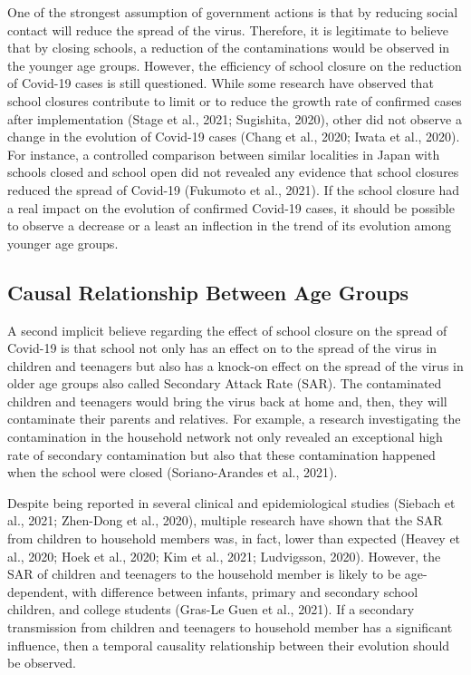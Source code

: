 \documentclass[]{elsarticle} %
\begin{document}
One of the strongest assumption of government actions is that by reducing social contact will reduce the spread of the virus. Therefore, it is legitimate to believe that by closing schools, a reduction of the contaminations would be observed in the younger age groups. However, the efficiency of school closure on the reduction of Covid-19 cases is still questioned. While some research have observed that school closures contribute to limit or to reduce the growth rate of confirmed cases after implementation (Stage et al., 2021; Sugishita, 2020), other did not observe a change in the evolution of Covid-19 cases (Chang et al., 2020; Iwata et al., 2020). For instance, a controlled comparison between similar localities in Japan with schools closed and school open did not revealed any evidence that school closures reduced the spread of Covid-19 (Fukumoto et al., 2021). If the school closure had a real impact on the evolution of confirmed Covid-19 cases, it should be possible to observe a decrease or a least an inflection in the trend of its evolution among younger age groups.

\hypertarget{causal-relationship-between-age-groups}{%
\subsection{Causal Relationship Between Age Groups}\label{causal-relationship-between-age-groups}}

A second implicit believe regarding the effect of school closure on the spread of Covid-19 is that school not only has an effect on to the spread of the virus in children and teenagers but also has a knock-on effect on the spread of the virus in older age groups also called Secondary Attack Rate (SAR). The contaminated children and teenagers would bring the virus back at home and, then, they will contaminate their parents and relatives. For example, a research investigating the contamination in the household network not only revealed an exceptional high rate of secondary contamination but also that these contamination happened when the school were closed (Soriano-Arandes et al., 2021).

Despite being reported in several clinical and epidemiological studies (Siebach et al., 2021; Zhen-Dong et al., 2020), multiple research have shown that the SAR from children to household members was, in fact, lower than expected (Heavey et al., 2020; Hoek et al., 2020; Kim et al., 2021; Ludvigsson, 2020). However, the SAR of children and teenagers to the household member is likely to be age-dependent, with difference between infants, primary and secondary school children, and college students (Gras-Le Guen et al., 2021). If a secondary transmission from children and teenagers to household member has a significant influence, then a temporal causality relationship between their evolution should be observed.
\end{document}
